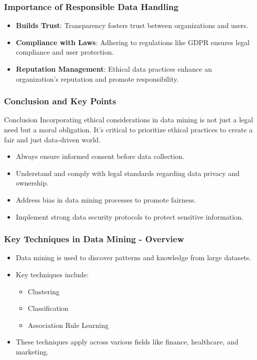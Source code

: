 \documentclass[aspectratio=169]{beamer}
\begin{document}
\begin{frame}[fragile]
    \frametitle{Importance of Responsible Data Handling}
    \begin{itemize}
        \item \textbf{Builds Trust}: Transparency fosters trust between organizations and users.
        \item \textbf{Compliance with Laws}: Adhering to regulations like GDPR ensures legal compliance and user protection.
        \item \textbf{Reputation Management}: Ethical data practices enhance an organization’s reputation and promote responsibility.
    \end{itemize}
\end{frame}

\begin{frame}[fragile]
    \frametitle{Conclusion and Key Points}
    \begin{block}{Conclusion}
        Incorporating ethical considerations in data mining is not just a legal need but a moral obligation. It's critical to prioritize ethical practices to create a fair and just data-driven world.
    \end{block}
    
    \begin{itemize}
        \item Always ensure informed consent before data collection.
        \item Understand and comply with legal standards regarding data privacy and ownership.
        \item Address bias in data mining processes to promote fairness.
        \item Implement strong data security protocols to protect sensitive information.
    \end{itemize}
\end{frame}

\begin{frame}[fragile]
    \frametitle{Key Techniques in Data Mining - Overview}
    \begin{itemize}
        \item Data mining is used to discover patterns and knowledge from large datasets.
        \item Key techniques include:
        \begin{itemize}
            \item Clustering
            \item Classification
            \item Association Rule Learning
        \end{itemize}
        \item These techniques apply across various fields like finance, healthcare, and marketing.
    \end{itemize}
\end{frame}
\end{document}
